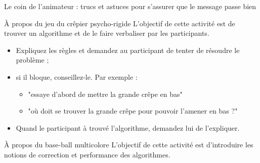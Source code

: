 \begin{frame}{Le coin de l'animateur : trucs et astuces pour s'assurer que le message passe bien}
  \begin{block}{À propos du jeu du crêpier psycho-rigide}
    L'objectif de cette activité est de trouver un algorithme et de le faire verbaliser par les participants.

    \begin{itemize}
    \item Expliquez les règles et demandez au participant de tenter de résoudre le problème ;
    \item si il bloque, conseillez-le. Par exemple :
      \begin{itemize}
        \item "essaye d'abord de mettre la grande crêpe en bas"
        \item "où doit se trouver la grande crêpe pour pouvoir l'amener en bas ?"
      \end{itemize}
    \item Quand le participant à trouvé l'algorithme, demandez lui de l'expliquer. 
    \end{itemize}
  \end{block}

  \begin{block}{À propos du base-ball multicolore}
    L'objectif de cette activité est d'introduire les notions de correction et performance des algorithmes.


\end{block}
\end{frame}
